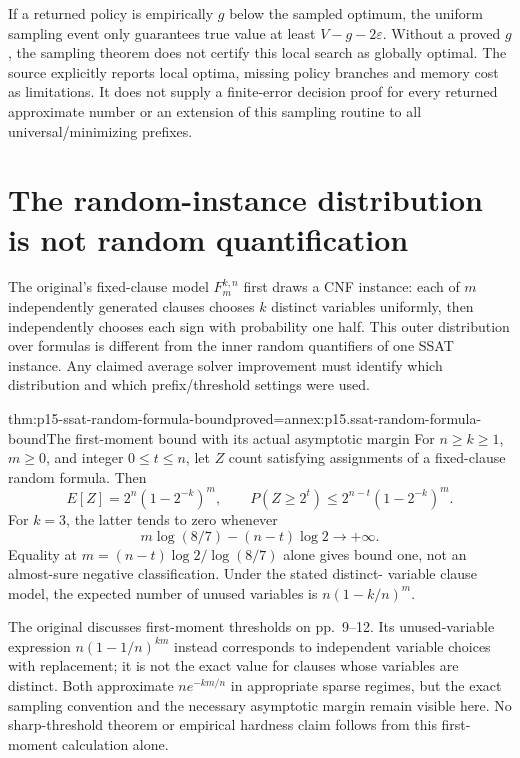 If a returned policy is empirically \(g\) below the sampled optimum,
the uniform sampling event only guarantees true value at least
\(V-g-2\varepsilon\). Without a proved \(g\), the sampling theorem
does not certify this local search as globally optimal. The source
explicitly reports local optima, missing policy branches and memory
cost as limitations. It does not supply a finite-error decision proof
for every returned approximate number or an extension of this sampling
routine to all universal/minimizing prefixes.

\section{The random-instance distribution is not random quantification}
\label{sec:p15-ssat-random-instances}

The original's fixed-clause model \(F^ {k,n}_m\) first draws a CNF
instance: each of \(m\) independently generated clauses chooses \(k\)
distinct variables uniformly, then independently chooses each sign with
probability one half. This outer distribution over formulas is different
from the inner random quantifiers of one SSAT instance. Any claimed
average solver improvement must identify which distribution and which
prefix/threshold settings were used.

\begin{hbtheorem}{thm:p15-ssat-random-formula-bound}{proved=annex:p15.ssat-random-formula-bound}{The first-moment bound with its actual asymptotic margin}
For \(n\geq k\geq1\), \(m\geq0\), and integer \(0\leq t\leq n\),
let \(Z\) count satisfying assignments of a fixed-clause random formula.
Then
\[
 E[Z]=2^n(1-2^{-k})^m,\qquad
 P(Z\geq2^t)\leq2^{n-t}(1-2^{-k})^m.
\]
For \(k=3\), the latter tends to zero whenever
\[
 m\log(8/7)-(n-t)\log2\longrightarrow+\infty.
\]
Equality at \(m=(n-t)\log2/\log(8/7)\) alone gives bound one,
not an almost-sure negative classification. Under the stated distinct-
variable clause model, the expected number of unused variables is
\(n(1-k/n)^m\).
\end{hbtheorem}

The original discusses first-moment thresholds on pp.~9--12. Its
unused-variable expression \(n(1-1/n)^{km}\) instead corresponds
to independent variable choices with replacement; it is not the exact
value for clauses whose variables are distinct. Both approximate
\(ne^{-km/n}\) in appropriate sparse regimes, but the exact sampling
convention and the necessary asymptotic margin remain visible here.
No sharp-threshold theorem or empirical hardness claim follows from
this first-moment calculation alone.

